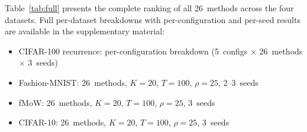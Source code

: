 \documentclass[11pt]{article}
\begin{document}
Table~\ref{tab:full} presents the complete ranking of all 26~methods across the four datasets.
Full per-dataset breakdowns with per-configuration and per-seed results are available in the supplementary material:
\begin{itemize}[leftmargin=*,topsep=2pt,itemsep=1pt]
    \item CIFAR-100 recurrence: per-configuration breakdown (5~configs $\times$ 26~methods $\times$ 3~seeds)
    \item Fashion-MNIST: 26~methods, $K{=}20$, $T{=}100$, $\rho{=}25$, 2--3~seeds
    \item fMoW: 26~methods, $K{=}20$, $T{=}100$, $\rho{=}25$, 3~seeds
    \item CIFAR-10: 26~methods, $K{=}20$, $T{=}100$, $\rho{=}25$, 3~seeds
\end{itemize}
\end{document}
